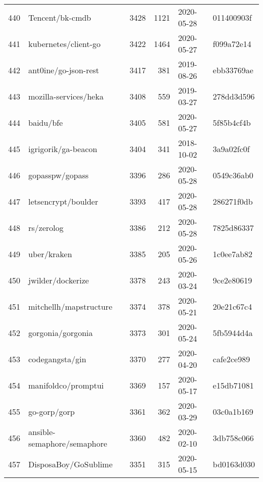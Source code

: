 \begin{longtable}{llrrll}
    440 &                                    Tencent/bk-cmdb &   3428 &   1121 & 2020-05-28 &  011400903f \\
    441 &                               kubernetes/client-go &   3422 &   1464 & 2020-05-27 &  f099a72e14 \\
    442 &                               ant0ine/go-json-rest &   3417 &    381 & 2019-08-26 &  ebb33769ae \\
    443 &                              mozilla-services/heka &   3408 &    559 & 2019-03-27 &  278dd3d596 \\
    444 &                                          baidu/bfe &   3405 &    581 & 2020-05-27 &  5f85b4cf4b \\
    445 &                                igrigorik/ga-beacon &   3404 &    341 & 2018-10-02 &  3a9a02fc0f \\
    446 &                                    gopasspw/gopass &   3396 &    286 & 2020-05-28 &  0549c36ab0 \\
    447 &                                letsencrypt/boulder &   3393 &    417 & 2020-05-28 &  286271f0db \\
    448 &                                         rs/zerolog &   3386 &    212 & 2020-05-28 &  7825d86337 \\
    449 &                                        uber/kraken &   3385 &    205 & 2020-05-26 &  1c0ee7ab82 \\
    450 &                                  jwilder/dockerize &   3378 &    243 & 2020-03-24 &  9ce2e80619 \\
    451 &                             mitchellh/mapstructure &   3374 &    378 & 2020-05-21 &  20e21c67c4 \\
    452 &                                  gorgonia/gorgonia &   3373 &    301 & 2020-05-24 &  5fb5944d4a \\
    453 &                                    codegangsta/gin &   3370 &    277 & 2020-04-20 &  cafe2ce989 \\
    454 &                                manifoldco/promptui &   3369 &    157 & 2020-05-17 &  e15db71081 \\
    455 &                                       go-gorp/gorp &   3361 &    362 & 2020-03-29 &  03c0a1b169 \\
    456 &                        ansible-semaphore/semaphore &   3360 &    482 & 2020-02-10 &  3db758c066 \\
    457 &                               DisposaBoy/GoSublime &   3351 &    315 & 2020-05-15 &  bd0163d030 \\

\end{longtable}
